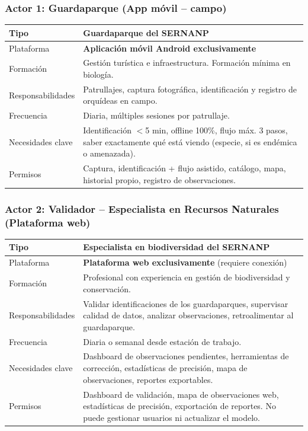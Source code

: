 \documentclass[12pt, a4paper]{article}
\begin{document}
\subsubsection{Actor 1: Guardaparque (App m\'ovil -- campo)}
\begin{longtable}{|p{3.5cm}|p{11cm}|}
\hline
Tipo & Guardaparque del SERNANP \\
\hline
Plataforma & \textbf{Aplicaci\'on m\'ovil Android exclusivamente} \\
\hline
Formaci\'on & Gesti\'on tur\'istica e infraestructura. Formaci\'on m\'inima en biolog\'ia. \\
\hline
Responsabilidades & Patrullajes, captura fotogr\'afica, identificaci\'on y registro de orqu\'ideas en campo. \\
\hline
Frecuencia & Diaria, m\'ultiples sesiones por patrullaje. \\
\hline
Necesidades clave & Identificaci\'on $<$5 min, offline 100\%, flujo m\'ax. 3 pasos, saber exactamente qu\'e est\'a viendo (especie, si es end\'emica o amenazada). \\
\hline
Permisos & Captura, identificaci\'on + flujo asistido, cat\'alogo, mapa, historial propio, registro de observaciones. \\
\hline
\end{longtable}

\subsubsection{Actor 2: Validador -- Especialista en Recursos Naturales (Plataforma web)}
\begin{longtable}{|p{3.5cm}|p{11cm}|}
\hline
Tipo & Especialista en biodiversidad del SERNANP \\
\hline
Plataforma & \textbf{Plataforma web exclusivamente} (requiere conexi\'on) \\
\hline
Formaci\'on & Profesional con experiencia en gesti\'on de biodiversidad y conservaci\'on. \\
\hline
Responsabilidades & Validar identificaciones de los guardaparques, supervisar calidad de datos, analizar observaciones, retroalimentar al guardaparque. \\
\hline
Frecuencia & Diaria o semanal desde estaci\'on de trabajo. \\
\hline
Necesidades clave & Dashboard de observaciones pendientes, herramientas de correcci\'on, estad\'isticas de precisi\'on, mapa de observaciones, reportes exportables. \\
\hline
Permisos & Dashboard de validaci\'on, mapa de observaciones web, estad\'isticas de precisi\'on, exportaci\'on de reportes. No puede gestionar usuarios ni actualizar el modelo. \\
\hline
\end{longtable}
\end{document}
